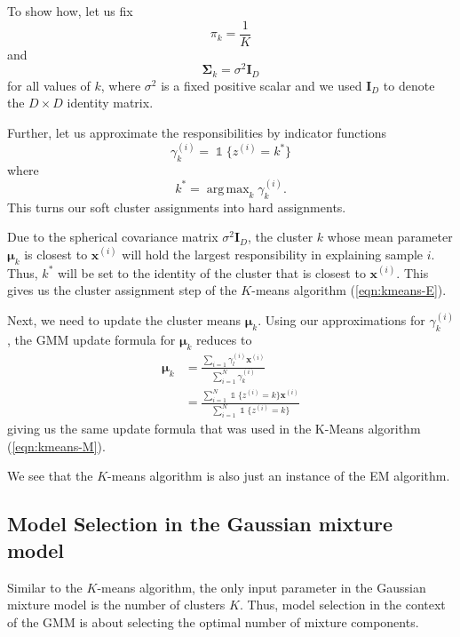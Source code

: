 \documentclass[final,3p,times,twocolumn]{elsarticle}
\DeclareMathOperator*{\argmax}{arg\,max}
\let\bs\boldsymbol
\DeclareMathOperator*{\id}{\mathds{1}}
\begin{document}
To show how, let us fix 
\begin{equation}
\pi_k = \frac{1}{K}
\end{equation}
and 
\begin{equation}
\bs\Sigma_k = \sigma^2 \bs I_D
\end{equation}
for all values of $k$, where $\sigma^2$ is a fixed positive scalar and we used $\bs I_D$ to denote the $D\times D$ identity matrix. 

Further, let us approximate the responsibilities by indicator functions
\begin{equation}
\label{eqn:gmmdelta}
\gamma_k^{(i)} = \id\{z^{(i)} = k^*\}
\end{equation}
where
\begin{equation}
k^* = \argmax_k \gamma_k^{(i)}.
\end{equation}
This turns our soft cluster assignments into hard assignments.

Due to the spherical covariance matrix $\sigma^2 \bs I_D$, the cluster $k$ whose mean parameter $\bs\mu_k$ is closest to $\bs x^{(i)}$ will hold the largest responsibility in explaining sample $i$.
Thus, $k^*$ will be set to the identity of the cluster that is closest to $\boldsymbol x^{(i)}$.
This gives us the cluster assignment step of the $K$-means algorithm (\ref{eqn:kmeans-E}).

Next, we need to update the cluster means $\boldsymbol \mu_k$.
Using our approximations for $\gamma_k^{(i)}$, the GMM update formula for $\boldsymbol \mu_k$ reduces to 
\begin{equation}
\begin{split}
\bs \mu_k &= \frac{\sum_{i=1}\gamma_l^{(i)} \bs x^{(i)}}{\sum_{i=1}^N \gamma_k^{(i)}}\\
&= \frac{\sum_{i=1}^N \id\{z^{(i)}=k\} \bs x^{(i)}}{\sum_{i=1}^N \id\{z^{(i)} = k\}}
\end{split}
\end{equation}
giving us the same update formula that was used in the K-Means algorithm (\ref{eqn:kmeans-M}).

We see that the $K$-means algorithm is also just an instance of the EM algorithm.

\subsection{Model Selection in the Gaussian mixture model}
Similar to the $K$-means algorithm, the only input parameter in the Gaussian mixture model is the number of clusters $K$.
Thus, model selection in the context of the GMM is about selecting the optimal number of mixture components.
\end{document}
